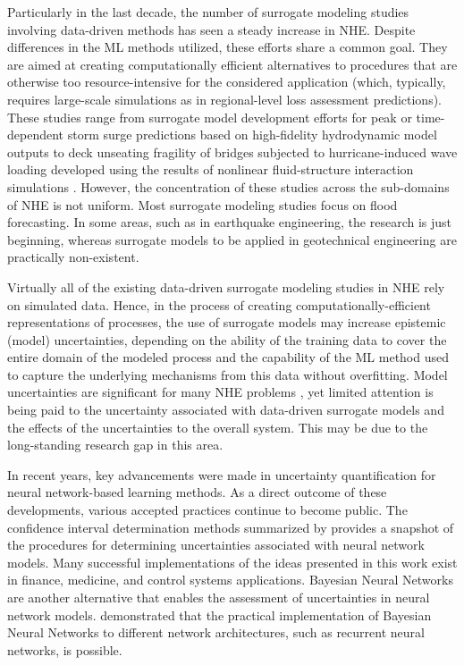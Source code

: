 Particularly in the last decade, the number of surrogate modeling studies involving data-driven methods has seen a steady increase in NHE. Despite differences in the ML methods utilized, these efforts share a common goal. They are aimed at creating computationally efficient alternatives to procedures that are otherwise too resource-intensive for the considered application (which, typically, requires large-scale simulations as in regional-level loss assessment predictions). These studies range from surrogate model development efforts for peak or time-dependent storm surge predictions based on high-fidelity hydrodynamic model outputs \citep{jia2016surrogate} to deck unseating fragility of bridges subjected to hurricane-induced wave loading developed using the results of nonlinear fluid-structure interaction simulations \citep{ataei2015fragility}. However, the concentration of these studies across the sub-domains of NHE is not uniform. Most surrogate modeling studies focus on flood forecasting. In some areas, such as in earthquake engineering, the research is just beginning, whereas surrogate models to be applied in geotechnical engineering are practically non-existent.

Virtually all of the existing data-driven surrogate modeling studies in NHE rely on simulated data. Hence, in the process of creating computationally-efficient representations of processes, the use of surrogate models may increase epistemic (model) uncertainties, depending on the ability of the training data to cover the entire domain of the modeled process and the capability of the ML method used to capture the underlying mechanisms from this data without overfitting. Model uncertainties are significant for many NHE problems \citep{gokkaya2016quantifying}, yet limited attention is being paid to the uncertainty associated with data-driven surrogate models and the effects of the uncertainties to the overall system. This may be due to the long-standing research gap in this area.

In recent years, key advancements were made in uncertainty quantification for neural network-based learning methods. As a direct outcome of these developments, various accepted practices continue to become public. The confidence interval determination methods summarized by \citet{kabir2018neural} provides a snapshot of the procedures for determining uncertainties associated with neural network models. Many successful implementations of the ideas presented in this work exist in finance, medicine, and control systems applications. Bayesian Neural Networks \citep{blundell2015weight} are another alternative that enables the assessment of uncertainties in neural network models. \citet{mcdermott2019bayesian} demonstrated that the practical implementation of Bayesian Neural Networks to different network architectures, such as recurrent neural networks, is possible. 

